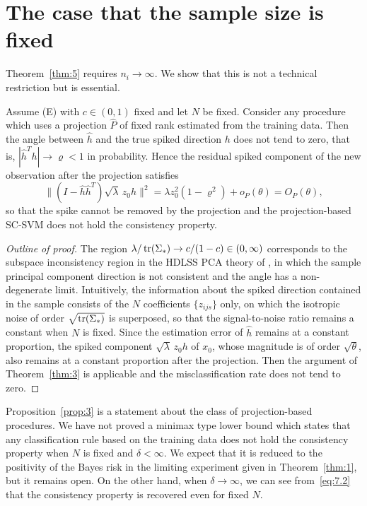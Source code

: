 \section{The case that the sample size is fixed}
\label{sec:fixed}

Theorem~\ref{thm:5} requires $n_i\to\infty$. We show that this is not a technical
restriction but is essential.

\begin{proposition}
\label{prop:3}
Assume \textup{(E)} with $c\in(0,1)$ fixed and let $N$ be fixed. Consider any
procedure which uses a projection $\hat P$ of fixed rank estimated from the
training data. Then the angle between $\hat h$ and the true spiked direction $h$
does not tend to zero, that is, $|\hat h^Th|\to\varrho<1$ in probability. Hence
the residual spiked component of the new observation after the projection
satisfies
\[
\bigl\|(I-\hat h\hat h^T)\sqrt{\lambda}\,z_0 h\bigr\|^2
=\lambda z_0^2(1-\varrho^2)+o_P(\theta)=O_P(\theta),
\]
so that the spike cannot be removed by the projection and the projection-based
SC-SVM does not hold the consistency property.
\end{proposition}

\begin{proof}[Outline of proof]
The region $\lambda/\operatorname{tr}(\Sigma_*)\to c/(1-c)\in(0,\infty)$ corresponds to the
subspace inconsistency region in the HDLSS PCA theory of \citet{jung2009}, in
which the sample principal component direction is not consistent and the angle has
a non-degenerate limit. Intuitively, the information about the spiked direction
contained in the sample consists of the $N$ coefficients $\{z_{ijs}\}$ only, on
which the isotropic noise of order $\sqrt{\operatorname{tr}(\Sigma_*)}$ is superposed, so that
the signal-to-noise ratio remains a constant when $N$ is fixed. Since the
estimation error of $\hat h$ remains at a constant proportion, the spiked
component $\sqrt{\lambda}\,z_0 h$ of $x_0$, whose magnitude is of order
$\sqrt{\theta}$, also remains at a constant proportion after the projection. Then
the argument of Theorem~\ref{thm:3} is applicable and the misclassification rate
does not tend to zero.
\end{proof}

\begin{remark}
\label{rem:7}
Proposition~\ref{prop:3} is a statement about the class of projection-based
procedures. We have not proved a minimax type lower bound which states that any
classification rule based on the training data does not hold the consistency
property when $N$ is fixed and $\delta<\infty$. We expect that it is reduced to the
positivity of the Bayes risk in the limiting experiment given in
Theorem~\ref{thm:1}, but it remains open. On the other hand, when $\delta\to\infty$,
we can see from~\eqref{eq:7.2} that the consistency property is recovered even for
fixed $N$.
\end{remark}
